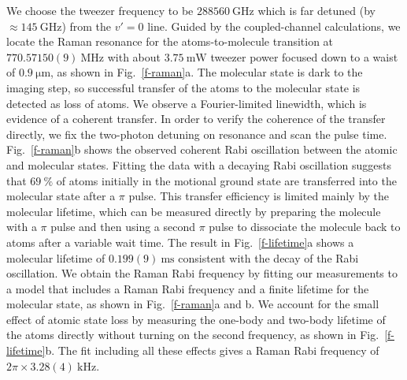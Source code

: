 \documentclass[aps,prl,twocolumn,10pt,superscriptaddress]{revtex4-1}
\begin{document}
We choose the tweezer frequency to be $288560~\mathrm{GHz}$
which is far detuned (by $\approx\!145~\mathrm{GHz}$) from the $v' = 0$ line.
Guided by the coupled-channel calculations,
we locate the Raman resonance for the atoms-to-molecule transition at
$770.57150(9) ~\mathrm{MHz}$ with about $3.75~\mathrm{mW}$ tweezer power
focused down to a waist of $ 0.9~\mathrm{\mu m}$, as shown in Fig.~\ref{f-raman}a.
The molecular state is dark to the imaging step,
so successful transfer of the atoms to the molecular state is detected as loss of atoms.
We observe a Fourier-limited linewidth, which is evidence of a coherent transfer.
In order to verify the coherence of the transfer directly,
we fix the two-photon detuning on resonance and scan the pulse time.
Fig.~\ref{f-raman}b shows the observed coherent Rabi oscillation between the atomic and molecular states.
Fitting the data with a decaying Rabi oscillation suggests that
$69~\mathrm{\%}$ of atoms initially in the motional ground state are transferred into the molecular state after a $\pi$ pulse.
This transfer efficiency is limited mainly by the molecular lifetime,
which can be measured directly by preparing the molecule with a $\pi $ pulse
and then using a second $\pi$ pulse to dissociate the molecule back to atoms
after a variable wait time.
The result in Fig.~\ref{f-lifetime}a shows a molecular lifetime of $0.199(9)~\mathrm{ms}$
consistent with the decay of the Rabi oscillation.
We obtain the Raman Rabi frequency by fitting our measurements to a model
that includes a Raman Rabi frequency and
a finite lifetime for the molecular state, as shown in Fig.~\ref{f-raman}a and b.
We account for the small effect of atomic state loss by measuring the one-body and
two-body lifetime of the atoms directly without turning on the second frequency,
as shown in Fig.~\ref{f-lifetime}b.
The fit including all these effects gives a Raman Rabi frequency
of $2\pi\times3.28(4)~\mathrm{kHz}$.
\end{document}
